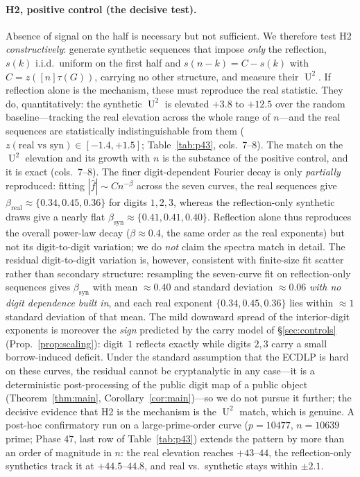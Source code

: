\documentclass[11pt]{article}
\theoremstyle{definition}
\DeclareMathOperator{\Uk}{U}
\begin{document}
\paragraph{H2, positive control (the decisive test).} Absence of signal
on the half is necessary but not sufficient. We therefore test H2
\emph{constructively}: generate synthetic sequences that impose
\emph{only} the reflection, $s(k)$ i.i.d.\ uniform on the first half and
$s(n-k)=C-s(k)$ with $C=z([n]\tau(G))$, carrying no other structure, and
measure their $\Uk^2$. If reflection alone is the mechanism, these must
reproduce the real statistic. They do, quantitatively: the synthetic
$\Uk^2$ is elevated $+3.8$ to $+12.5$ over the random baseline---tracking
the real elevation across the whole range of $n$---and the real sequences
are statistically indistinguishable from them
($z(\text{real vs syn})\in[-1.4,+1.5]$; Table~\ref{tab:p43}, cols.\
7--8). The match on the $\Uk^2$ elevation and its growth with $n$ is the
substance of the positive control, and it is exact (cols.\ 7--8). The
finer digit-dependent Fourier decay is only \emph{partially} reproduced:
fitting $|\hat f|\sim C n^{-\beta}$ across the seven curves, the real
sequences give $\beta_{\mathrm{real}}\approx\{0.34,0.45,0.36\}$ for
digits $1,2,3$, whereas the reflection-only synthetic draws give a nearly
flat $\beta_{\mathrm{syn}}\approx\{0.41,0.41,0.40\}$. Reflection alone
thus reproduces the overall power-law decay ($\beta\approx0.4$, the same
order as the real exponents) but not its digit-to-digit variation; we do
\emph{not} claim the spectra match in detail. The residual
digit-to-digit variation is, however, consistent with finite-size fit
scatter rather than secondary structure: resampling the seven-curve fit
on reflection-only sequences gives $\beta_{\mathrm{syn}}$ with mean
$\approx0.40$ and standard deviation $\approx0.06$ \emph{with no digit
dependence built in}, and each real exponent $\{0.34,0.45,0.36\}$ lies
within $\approx1$ standard deviation of that mean. The mild downward
spread of the interior-digit exponents is moreover the \emph{sign}
predicted by the carry model of \S\ref{sec:controls}
(Prop.~\ref{prop:scaling}): digit~$1$ reflects exactly while digits $2,3$
carry a small borrow-induced deficit. Under the standard assumption that
the ECDLP is hard on these curves, the residual cannot be cryptanalytic in
any case---it is a deterministic post-processing of the public digit map
of a public object (Theorem~\ref{thm:main}, Corollary~\ref{cor:main})---so
we do not pursue it further; the decisive evidence that H2 is the
mechanism is the $\Uk^2$ match, which is genuine. A post-hoc confirmatory
run on a large-prime-order curve ($p=10477$, $n=10639$ prime; Phase 47,
last row of Table~\ref{tab:p43}) extends the pattern by more than an order
of magnitude in $n$: the real elevation reaches $+43$--$44$, the
reflection-only synthetics track it at $+44.5$--$44.8$, and real vs.\
synthetic stays within $\pm2.1$.
\end{document}
